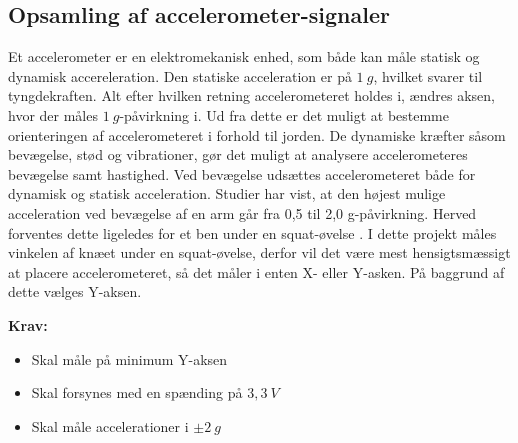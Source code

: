 \subsection{Opsamling af accelerometer-signaler} \label{sec:acc_teori}
Et accelerometer er en elektromekanisk enhed, som både kan måle statisk og dynamisk accereleration. Den statiske acceleration er på $1~g$, hvilket svarer til tyngdekraften. Alt efter hvilken retning accelerometeret holdes i, ændres aksen, hvor der måles $1~g$-påvirkning i.
Ud fra dette er det muligt at bestemme orienteringen af accelerometeret i forhold til jorden. De dynamiske kræfter såsom bevægelse, stød og vibrationer, gør det muligt at analysere accelerometeres bevægelse samt hastighed. Ved bevægelse udsættes accelerometeret både for dynamisk og statisk acceleration. Studier har vist, at den højest mulige acceleration ved bevægelse af en arm går fra 0,5 til 2,0 g-påvirkning. Herved forventes dette ligeledes for et ben under en squat-øvelse \citep{bernmarka2002}. I dette projekt måles vinkelen af knæet under en squat-øvelse, derfor vil det være mest hensigtsmæssigt at placere accelerometeret, så det måler i enten X- eller Y-asken. På baggrund af dette vælges Y-aksen.

\vspace{3mm}

\textbf{Krav:}
\begin{itemize}
\item Skal måle på minimum Y-aksen
\item Skal forsynes med en spænding på $3,3~V$
\item Skal måle accelerationer i $\pm2~g$
\end{itemize}